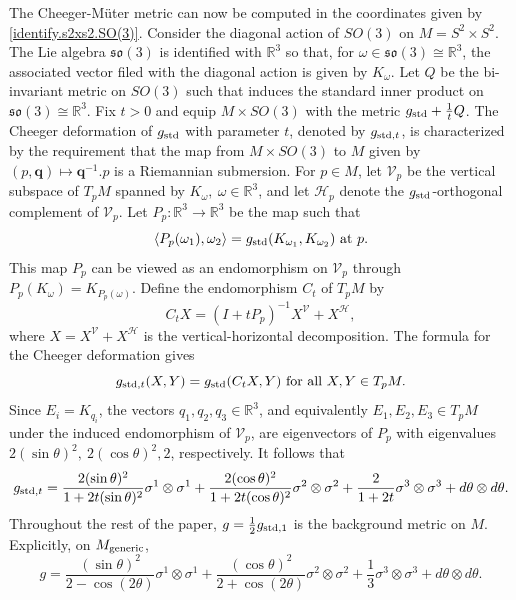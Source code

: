 \documentclass[11pt]{amsart}
\theoremstyle{definition}
\begin{document}
The Cheeger-M\"uter metric can now be computed in the coordinates given by \eqref{identify.s2xs2.SO(3)}.
Consider the diagonal action of $SO(3)$ on $M = S^2\times S^2$.
The Lie algebra $\mathfrak{so}(3)$ is identified with $\mathbb{R}^3$ so that, for $\omega\in \mathfrak{so}(3)\cong\mathbb{R}^3$,
the associated vector filed with the diagonal action is given by $K_\omega$.
Let $Q$ be the bi-invariant metric on $SO(3)$ such that induces the standard inner product on $\mathfrak{so}(3)\cong \mathbb{R}^3$.
Fix $t>0$ and equip $M \times SO(3)$ with the metric $g_{\textup{std}}+\frac{1}{t}Q$.
The Cheeger deformation of $g_{\textup{std}}$ with parameter $t$, denoted by $g_{\textup{std},t}$, is characterized by the requirement that the map from $M \times SO(3)$ to $M$ given by $(p,\mathbf{q})\mapsto \mathbf{q}^{-1}.p$ is a Riemannian submersion.
For $p\in M$, let $\mathcal{V}_p$ be the vertical subspace of $T_p M$ spanned by $K_\omega,\ \omega\in\mathbb{R}^3$,
 and let $\mathcal{H}_p$ denote the $g_{\textup{std}}$-orthogonal complement of $\mathcal{V}_p$.
Let $P_p:\mathbb{R}^3\to \mathbb{R}^3$ be the map such that
\[
\langle P_p(\omega_1), \omega_2\rangle= g_{\textup{std}}(K_{\omega_1},K_{\omega_2})\ \textup{at}\ p.
\]
This map $P_p$ can be viewed as an endomorphism on $\mathcal{V}_p$ through $P_p(K_\omega)=K_{P_p(\omega)}$.
Define the endomorphism $C_t$ of $T_p M$ by 
\[
C_tX= (I+tP_p)^{-1}X^{\mathcal{V}}+X^{\mathcal{H}},
\]
where $X=X^{\mathcal{V}}+X^{\mathcal{H}}$ is the vertical-horizontal decomposition.
The formula for the Cheeger deformation \cite{Ziller} gives
\[
g_{\textup{std},t}(X,Y)= g_{\textup{std}}(C_t X, Y)\ \textup{for all}\ X,Y\in T_p M.
\]
Since $E_i=K_{q_i}$, the vectors $q_1,q_2,q_3\in\mathbb{R}^3$, and equivalently $E_1,E_2,E_3\in T_p M$ under the induced endomorphism of $\mathcal{V}_p$, are eigenvectors of $P_p$ with eigenvalues $2(\sin\theta)^2,\ 2(\cos\theta)^2, 2$, respectively.
It follows that
\[
g_{\textup{std},t}=\frac{2(\sin\theta)^2}{1+2t(\sin\theta)^2}\sigma^1\otimes \sigma^1+\frac{2(\cos\theta)^2}{1+2t(\cos\theta)^2}\sigma^2\otimes \sigma^2
+\frac{2}{1+2t}\sigma^3\otimes \sigma^3+ d\theta\otimes d\theta.
\]
Throughout the rest of the paper, $g=\frac{1}{2}g_{\textup{std},1}$ is the background metric on $M$.
Explicitly, on $M_{\text{\rm generic}}$,
\[
g=\frac{(\sin\theta)^2}{2-\cos(2\theta)}\sigma^1\otimes \sigma^1
+\frac{(\cos\theta)^2}{2+\cos(2\theta)}\sigma^2\otimes \sigma^2
+\frac{1}{3}\sigma^3\otimes \sigma^3+d\theta\otimes d\theta.
\]
\end{document}
